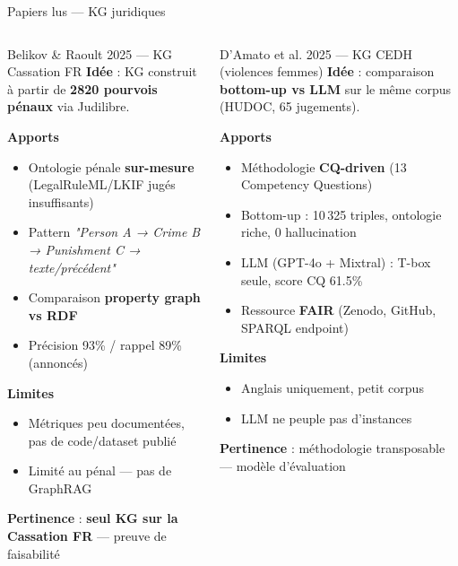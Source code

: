 \documentclass[aspectratio=169,10pt]{beamer}
\begin{document}
\begin{frame}{Papiers lus --- KG juridiques}
  \begin{columns}[T,onlytextwidth]
    \begin{block}{\small Belikov \& Raoult 2025 --- KG Cassation FR}
    \scriptsize
    \textbf{Idée} : KG construit à partir de \textbf{2820 pourvois pénaux} via Judilibre.

    \vspace{0.3em}
    \textbf{Apports}
    \begin{itemize}\setlength\itemsep{-0.1em}
      \item Ontologie pénale \textbf{sur-mesure} (LegalRuleML/LKIF jugés insuffisants)
      \item Pattern \textit{"Person A → Crime B → Punishment C → texte/précédent"}
      \item Comparaison \textbf{property graph vs RDF}
      \item Précision 93\% / rappel 89\% (annoncés)
    \end{itemize}
    \textbf{Limites}
    \begin{itemize}\setlength\itemsep{-0.1em}
      \item Métriques peu documentées, pas de code/dataset publié
      \item Limité au pénal --- pas de GraphRAG
    \end{itemize}
    \textbf{Pertinence} : \textbf{seul KG sur la Cassation FR} --- preuve de faisabilité
    \end{block}

    \begin{block}{\small D'Amato et al. 2025 --- KG CEDH (violences femmes)}
    \scriptsize
    \textbf{Idée} : comparaison \textbf{bottom-up vs LLM} sur le même corpus (HUDOC, 65 jugements).

    \vspace{0.3em}
    \textbf{Apports}
    \begin{itemize}\setlength\itemsep{-0.1em}
      \item Méthodologie \textbf{CQ-driven} (13 Competency Questions)
      \item Bottom-up : 10\,325 triples, ontologie riche, 0 hallucination
      \item LLM (GPT-4o + Mixtral) : T-box seule, score CQ 61.5\%
      \item Ressource \textbf{FAIR} (Zenodo, GitHub, SPARQL endpoint)
    \end{itemize}
    \textbf{Limites}
    \begin{itemize}\setlength\itemsep{-0.1em}
      \item Anglais uniquement, petit corpus
      \item LLM ne peuple pas d'instances
    \end{itemize}
    \textbf{Pertinence} : méthodologie transposable --- modèle d'évaluation
    \end{block}
  \end{columns}
\end{frame}
\end{document}
